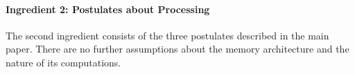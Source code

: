 \documentclass[11pt,letterpaper]{article}
\newcommand\mhahn[1]{{\color{red}(#1)}}
\begin{document}
%
%
%
%

\paragraph{Ingredient 2: Postulates about Processing}
The second ingredient consists of the three postulates described in the main paper.
There are no further assumptions about the memory architecture and the nature of its computations.
\end{document}
